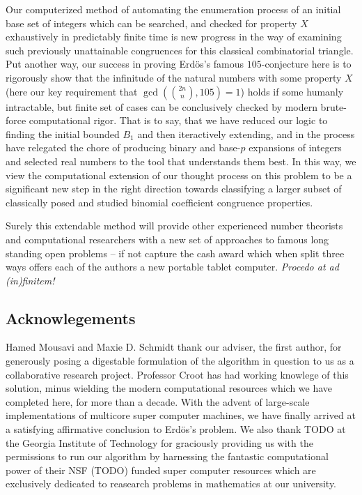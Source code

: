 \documentclass[12pt]{article}
\begin{document}
Our computerized method of automating the enumeration process 
of an initial base set of integers which can be searched, and checked for property $X$ exhaustively in 
predictably finite time is new progress in the way of examining such previously unattainable 
congruences for this classical combinatorial triangle. Put another way, our success in proving 
Erd\"os's famous $105$-conjecture here is to rigorously show that the infinitude of the natural numbers 
with some property $X$ (here our key requirement that $\gcd(\binom{2n}{n}, 105)=1$) holds if 
some humanly intractable, but finite set of cases can be conclusively checked by modern brute-force 
computational rigor. That is to say, that we have reduced our logic to finding the initial bounded $B_1$ and 
then iteractively extending, and in the process have relegated the chore of producing binary and 
base-$p$ expansions of integers and selected real numbers to the tool that understands them best. 
In this way, we view the computational extension of our thought process on this problem to be a 
significant new step in the right direction towards classifying a larger subset of classically 
posed and studied binomial coefficient congruence properties. 

Surely this extendable method will 
provide other experienced number theorists and computational researchers with a new set of 
approaches to famous long standing open problems -- if not capture the cash award which when 
split three ways offers each of the authors a new portable tablet computer. 
\emph{Procedo at ad (in)finitem!}

\subsection*{Acknowlegements} 

Hamed Mousavi and Maxie D. Schmidt thank our adviser, the first author, 
for generously posing a digestable formulation of the algorithm in question to us as a 
collaborative research project. Professor Croot has had working knowlege of this solution, minus 
wielding the modern computational resources which we have completed here, for more than a decade. 
With the advent of large-scale implementations of multicore super computer machines, we have finally 
arrived at a satisfying affirmative conclusion to Erd\"os's problem. 
We also thank TODO at the Georgia Institute of Technology for graciously providing us with the 
permissions to run our algorithm by harnessing the fantastic computational power of their NSF (TODO) 
funded super computer resources which are exclusively dedicated to reasearch problems in mathematics at 
our university. 
\end{document}
